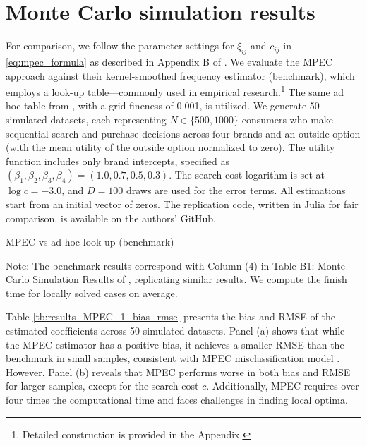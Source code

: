 \documentclass[12pt]{article}
\begin{document}
\section{Monte Carlo simulation results}

For comparison, we follow the parameter settings for \(\xi_{ij}\) and \(c_{ij}\) in \eqref{eq:mpec_formula} as described in Appendix B of \cite{ursu2023sequential}. We evaluate the MPEC approach against their kernel-smoothed frequency estimator (benchmark), which employs a look-up table—commonly used in empirical research.\footnote{Detailed construction is provided in the Appendix.} The same ad hoc table from \cite{ursu2023sequential}, with a grid fineness of 0.001, is utilized.
We generate 50 simulated datasets, each representing \(N\in\{500,1000\}\) consumers who make sequential search and purchase decisions across four brands and an outside option (with the mean utility of the outside option normalized to zero). The utility function includes only brand intercepts, specified as \((\beta_1,\beta_2,\beta_3,\beta_4) = (1.0, 0.7, 0.5, 0.3)\). The search cost logarithm is set at \(\log c = -3.0\), and \(D = 100\) draws are used for the error terms. All estimations start from an initial vector of zeros. The replication code, written in Julia for fair comparison, is available on the authors' GitHub.


\begin{table}[!htbp]
  \begin{center}
      \caption{MPEC vs ad hoc look-up (benchmark)}
      \label{tb:results_MPEC_1_bias_rmse} 
      \subfloat[$N=500$]{}
      \subfloat[$N=1000$]{}
  \end{center}
  \footnotesize
  Note: The benchmark results correspond with Column (4) in Table B1: Monte Carlo Simulation Results of \cite{ursu2023sequential}, replicating similar results. We compute the finish time for locally solved cases on average. 
\end{table} 

Table \ref{tb:results_MPEC_1_bias_rmse} presents the bias and RMSE of the estimated coefficients across 50 simulated datasets. Panel (a) shows that while the MPEC estimator has a positive bias, it achieves a smaller RMSE than the benchmark in small samples, consistent with MPEC misclassification model \citep{lu2014mpec}. However, Panel (b) reveals that MPEC performs worse in both bias and RMSE for larger samples, except for the search cost \(c\). Additionally, MPEC requires over four times the computational time and faces challenges in finding local optima. 
\end{document}
